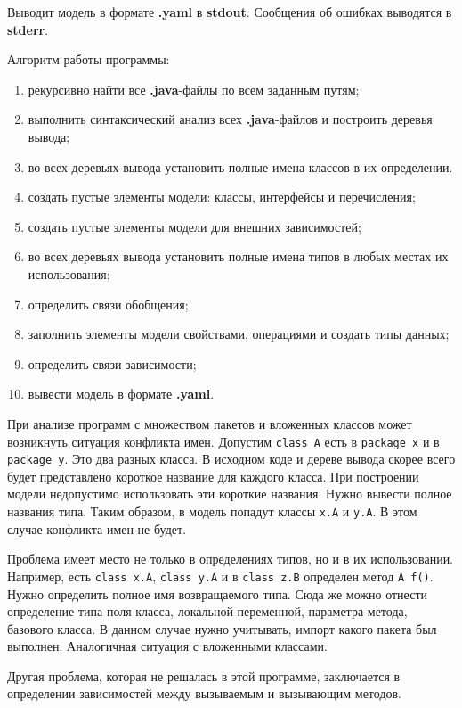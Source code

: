 Выводит модель в формате \textbf{.yaml} в \textbf{stdout}.
Сообщения об ошибках выводятся в \textbf{stderr}.

Алгоритм работы программы:
\begin{enumerate}
\item рекурсивно найти все \textbf{.java}-файлы по всем заданным путям;
\item выполнить синтаксический анализ всех \textbf{.java}-файлов и построить
деревья вывода;
\item во всех деревьях вывода установить полные имена классов в их определении.
\item создать пустые элементы модели: классы, интерфейсы и перечисления;
\item создать пустые элементы модели для внешних зависимостей;
\item во всех деревьях вывода установить полные имена типов в любых местах их
использования;
\item определить связи обобщения;
\item заполнить элементы модели свойствами, операциями и создать типы данных;
\item определить связи зависимости;
\item вывести модель в формате \textbf{.yaml}.
\end{enumerate}

При анализе программ с множеством пакетов и вложенных классов может возникнуть
ситуация конфликта имен.
Допустим \verb;class A; есть в \verb;package x; и в \verb;package y;.
Это два разных класса.
В исходном коде и дереве вывода скорее всего будет представлено короткое название
для каждого класса.
При построении модели недопустимо использовать эти короткие названия.
Нужно вывести полное названия типа.
Таким образом, в модель попадут классы \verb;x.A; и \verb;y.A;.
В этом случае конфликта имен не будет.

Проблема имеет место не только в определениях типов, но и в их использовании.
Например, есть \verb;class x.A;, \verb;class y.A; и в \verb;class z.B; определен
метод \verb;A f();.
Нужно определить полное имя возвращаемого типа.
Сюда же можно отнести определение типа поля класса, локальной переменной,
параметра метода, базового класса.
В данном случае нужно учитывать, импорт какого пакета был выполнен.
Аналогичная ситуация с вложенными классами.

Другая проблема, которая не решалась в этой программе, заключается в определении
зависимостей между вызываемым и вызывающим методов.

